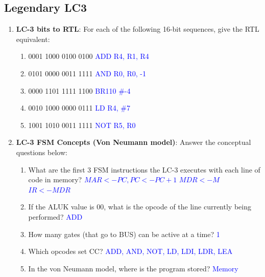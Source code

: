 \documentclass{article}
\begin{document}
\begin{enumerate}[label=(\alph*)]
\newpage
\section{Legendary LC3}
    \begin{enumerate}[label=(\alph*)]
        \item \textbf{LC-3 bits to RTL}: For each of the following 16-bit sequences, give the RTL equivalent:
        \begin{enumerate}[label=(\roman*),itemsep = 10pt]
            \item 0001 1000 0100 0100 \textcolor{blue}{ADD R4, R1, R4}
            \item 0101 0000 0011 1111 \textcolor{blue}{AND R0, R0, -1}
            \item 0000 1101 1111 1100 \textcolor{blue}{BR{110} \#-4}
            \item 0010 1000 0000 0111 \textcolor{blue}{LD R4, \#7}
            \item 1001 1010 0011 1111 \textcolor{blue}{NOT R5, R0}
        \end{enumerate}
        \item \textbf{LC-3 FSM Concepts (Von Neumann model)}: Answer the conceptual questions below:
        \begin{enumerate}[label=(\roman*),itemsep = 10pt]
            \item What are the first 3 FSM instructions the LC-3 executes with each line of code in memory?
            \newline \textcolor{blue}{$MAR<-PC, PC<-PC+1$ \newline $MDR <-M$ \newline $IR<-MDR$}
            \item If the ALUK value is 00, what is the opcode of the line currently being performed?
            \newline \textcolor{blue}{ADD}
            \item How many gates (that go to BUS) can be active at a time?
            \newline \textcolor{blue}{1}
            \item Which opcodes set CC?
            \newline \textcolor{blue}{ADD, AND, NOT, LD, LDI, LDR, LEA}
            \item In the von Neumann model, where is the program stored?
            \newline \textcolor{blue}{Memory}
            

\end{enumerate}
\end{enumerate}
\end{enumerate}
\end{document}
